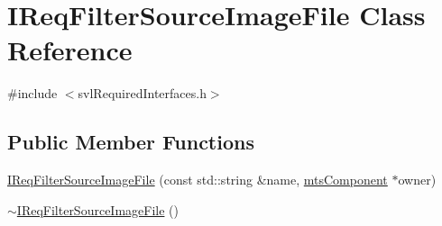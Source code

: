 \hypertarget{class_i_req_filter_source_image_file}{\section{I\-Req\-Filter\-Source\-Image\-File Class Reference}
\label{class_i_req_filter_source_image_file}
}


{\ttfamily \#include $<$svl\-Required\-Interfaces.\-h$>$}

\subsection*{Public Member Functions}
\begin{DoxyCompactItemize}
\item 
\hyperlink{class_i_req_filter_source_image_file_a9996644ef89b3a71d11ca36eb54be98d}{I\-Req\-Filter\-Source\-Image\-File} (const std\-::string \&name, \hyperlink{classmts_component}{mts\-Component} $\ast$owner)
\item 
\hyperlink{class_i_req_filter_source_image_file_a6446f1b47eef8bbf21f44d7b9e31e587}{$\sim$\-I\-Req\-Filter\-Source\-Image\-File} ()
\end{DoxyCompactItemize}
